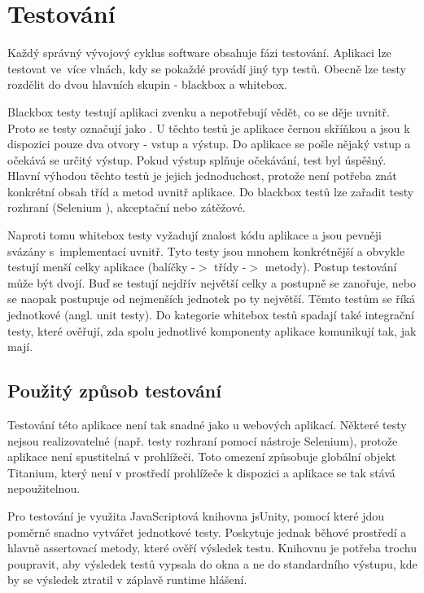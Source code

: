 \chapter{Testování}

Každý správný vývojový cyklus software obsahuje fázi testování\cite{zivotnicyklus}. Aplikaci lze testovat ve~více vlnách, kdy se pokaždé provádí jiný typ testů. Obecně lze testy rozdělit do dvou hlavních skupin - blackbox a whitebox.

Blackbox testy testují aplikaci zvenku a nepotřebují vědět, co se děje uvnitř. Proto se testy označují jako . U těchto testů je aplikace černou skříňkou a jsou k dispozici pouze dva otvory - vstup a výstup. Do aplikace se pošle nějaký vstup a očekává se určitý výstup. Pokud výstup splňuje očekávání, test byl úspěšný. Hlavní výhodou těchto testů je jejich jednoduchost, protože není potřeba znát konkrétní obsah tříd a metod uvnitř aplikace. Do blackbox testů lze zařadit testy rozhraní (Selenium \cite{selenium}), akceptační nebo zátěžové.

Naproti tomu whitebox testy vyžadují znalost kódu aplikace a jsou pevněji svázány s~implementací uvnitř. Tyto testy jsou mnohem konkrétnější a obvykle testují menší celky aplikace (balíčky -$>$ třídy -$>$ metody). Postup testování může být dvojí. Buď se testují nejdřív největší celky a postupně se zanořuje, nebo se naopak postupuje od nejmenších jednotek po ty největší. Těmto testům se říká jednotkové (angl. unit testy). Do kategorie whitebox testů spadají také integrační testy, které ověřují, zda spolu jednotlivé komponenty aplikace komunikují tak, jak mají.

\section{Použitý způsob testování}

Testování této aplikace není tak snadné jako u webových aplikací. Některé testy nejsou realizovatelné (např. testy rozhraní pomocí nástroje Selenium), protože aplikace není spustitelná v prohlížeči. Toto omezení způsobuje globální objekt Titanium, který není v prostředí prohlížeče k dispozici a aplikace se tak stává nepoužitelnou.

Pro testování je využita JavaScriptová knihovna jsUnity\cite{jsunity}, pomocí které jdou poměrně snadno vytvářet jednotkové testy. Poskytuje jednak běhové prostředí a hlavně assertovací metody, které ověří výsledek testu. Knihovnu je potřeba trochu poupravit, aby výsledek testů vypsala do okna a ne do standardního výstupu, kde by se výsledek ztratil v záplavě runtime hlášení.

